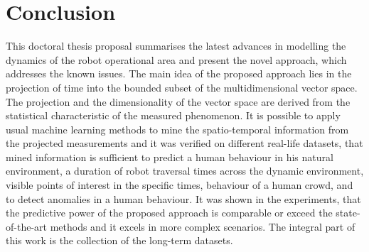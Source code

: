 \section{Conclusion\label{sec:conclusion}}

This doctoral thesis proposal summarises the latest advances in modelling the dynamics of the robot operational area and present the novel approach, which addresses the known issues.
The main idea of the proposed approach lies in the projection of time into the bounded subset of the multidimensional vector space.
The projection and the dimensionality of the vector space are derived from the statistical characteristic of the measured phenomenon.
It is possible to apply usual machine learning methods to mine the spatio-temporal information from the projected measurements and it was verified on different real-life datasets, that mined information is sufficient to predict a human behaviour in his natural environment, a duration of robot traversal times across the dynamic environment, visible points of interest in the specific times, behaviour of a human crowd, and to detect anomalies in a human behaviour.
It was shown in the experiments, that the predictive power of the proposed approach is comparable or exceed the state-of-the-art methods and it excels in more complex scenarios.
The integral part of this work is the collection of the long-term datasets.